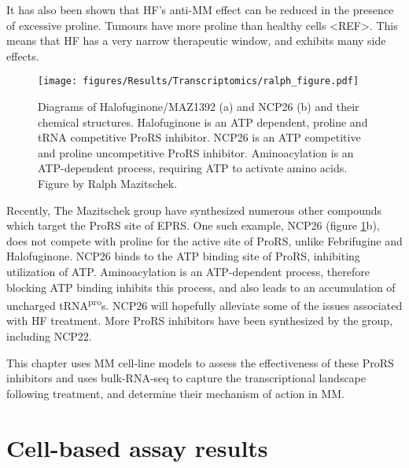 It has also been shown that HF's anti-MM effect can be reduced in the presence of excessive proline.
Tumours have more proline than healthy cells <REF>.
This means that HF has a very narrow therapeutic window, and exhibits many side effects.

\begin{figure}[ht]
    \centering
    \texttt{[image: figures/Results/Transcriptomics/ralph\_figure.pdf]}
    \caption[Halofuginone and NCP26 structures]{Diagrams of Halofuginone/MAZ1392 (a) and NCP26 (b) and their chemical structures.
    Halofuginone is an ATP dependent, proline and tRNA competitive ProRS inhibitor.
    NCP26 is an ATP competitive and proline uncompetitive ProRS inhibitor.
    Aminoacylation is an ATP-dependent process, requiring ATP to activate amino acids.
    Figure by Ralph Mazitschek.
    }
    \label{fig:ralph_diagrams}
\end{figure}

Recently, The Mazitschek group have synthesized numerous other compounds which target the ProRS site of EPRS.
One such example, NCP26 (figure \ref{fig:ralph_diagrams}b), does not compete with proline for the active site of ProRS, unlike Febrifugine and Halofuginone.
NCP26 binds to the ATP binding site of ProRS, inhibiting utilization of ATP\@.
Aminoacylation is an ATP-dependent process, therefore blocking ATP binding inhibits this process, and also leads to an accumulation of uncharged tRNA\textsuperscript{pro}s.
NCP26 will hopefully alleviate some of the issues associated with HF treatment.
More ProRS inhibitors have been synthesized by the group, including NCP22.

This chapter uses MM cell-line models to assess the effectiveness of these ProRS inhibitors and uses bulk-RNA-seq to capture the transcriptional landscape following treatment, and determine their mechanism of action in MM\@.

\clearpage

\section{Cell-based assay results}
